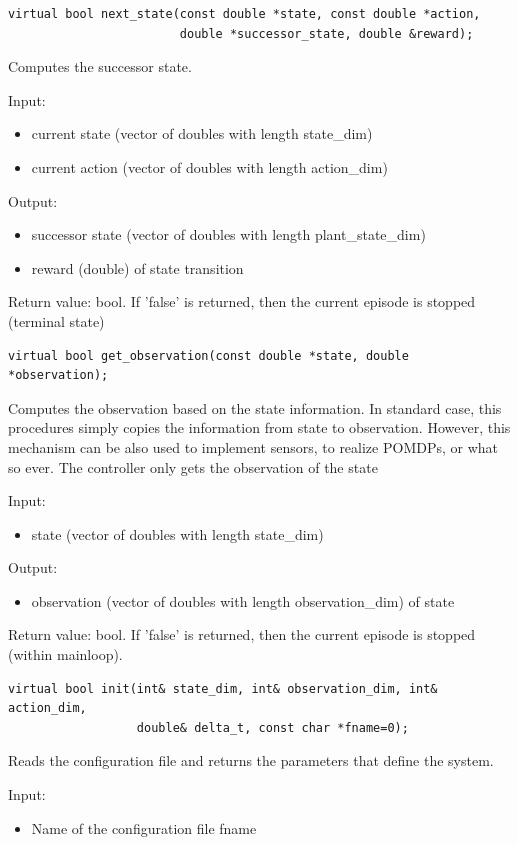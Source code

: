 \documentclass[a4paper,12pt,german]{article}
\newcommand{\ite}{\begin{itemize}}
\newcommand{\eti}{\end{itemize}}
\begin{document}
\begin{verbatim}
virtual bool next_state(const double *state, const double *action, 
                        double *successor_state, double &reward);
\end{verbatim}

Computes the successor state.

Input: 
\ite
\item current state (vector of doubles with length state\_dim)
\item current action (vector of doubles with length action\_dim)
\eti

Output: 
\ite
\item successor state (vector of doubles with length plant\_state\_dim) 
\item reward (double) of state transition
\eti

Return value: bool. If 'false' is returned, then the current episode is stopped (terminal state)

\begin{verbatim}
virtual bool get_observation(const double *state, double *observation);
\end{verbatim}

Computes the observation based on the state information.
In standard case, this procedures simply copies the information from state to observation.
However, this mechanism can be also used to implement sensors, to realize POMDPs, or
what so ever. The controller only gets the observation of the state

Input: 
\ite
\item state (vector of doubles with length state\_dim)
\eti

Output: 
\ite
\item observation (vector of doubles with length observation\_dim) of state
\eti

Return value: bool. If 'false' is returned, then the current episode is stopped (within mainloop).


\begin{verbatim}
virtual bool init(int& state_dim, int& observation_dim, int& action_dim, 
                  double& delta_t, const char *fname=0);
\end{verbatim}

Reads the configuration file and returns the parameters that define the system.


Input: 
\ite
\item Name of the configuration file fname
\eti
\end{document}
